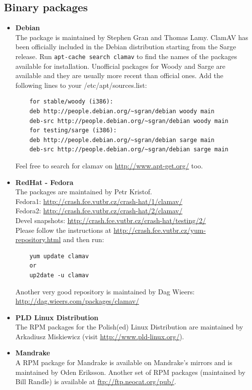 \documentclass[a4paper,titlepage,12pt]{article}
\begin{document}
    \subsection{Binary packages}
    \begin{itemize}
	\item \textbf{Debian}\\
	The package is maintained by Stephen Gran and Thomas Lamy.
	ClamAV has been officially included in the Debian distribution
	starting from the Sarge release. Run \verb+apt-cache search clamav+ to
	find the names of the packages available for installation. Unofficial
	packages for Woody and Sarge are available and they are usually more
	recent than official ones. Add the following lines to your
	/etc/apt/sources.list:
	\begin{verbatim}
	for stable/woody (i386):
	deb http://people.debian.org/~sgran/debian woody main
	deb-src http://people.debian.org/~sgran/debian woody main
	for testing/sarge (i386):
	deb http://people.debian.org/~sgran/debian sarge main
	deb-src http://people.debian.org/~sgran/debian sarge main
	\end{verbatim}
	Feel free to search for clamav on \url{http://www.apt-get.org/} too. 

	\item \textbf{RedHat - Fedora}\\
	The packages are maintained by Petr Kristof.\\
	Fedora1: \url{http://crash.fce.vutbr.cz/crash-hat/1/clamav/}\\
	Fedora2: \url{http://crash.fce.vutbr.cz/crash-hat/2/clamav/}\\
	Devel snapshots: \url{http://crash.fce.vutbr.cz/crash-hat/testing/2/}\\
	Please follow the instructions at
	\url{http://crash.fce.vutbr.cz/yum-repository.html} and then run:
	\begin{verbatim}
	yum update clamav
	or
	up2date -u clamav
	\end{verbatim}
	Another very good repository is maintained by Dag Wieers:
	\url{http://dag.wieers.com/packages/clamav/}

	\item \textbf{PLD Linux Distribution}\\
	The RPM packages for the Polish(ed) Linux Distribution are maintained
	by Arkadiusz Miskiewicz (visit \url{http://www.pld-linux.org/}). 

	\item \textbf{Mandrake}\\
	A RPM package for Mandrake is available on Mandrake's mirrors and is
	maintained by Oden Eriksson. Another set of RPM packages (maintained
	by Bill Randle) is available at \url{ftp://ftp.neocat.org/pub/}.


\end{itemize}
\end{document}

